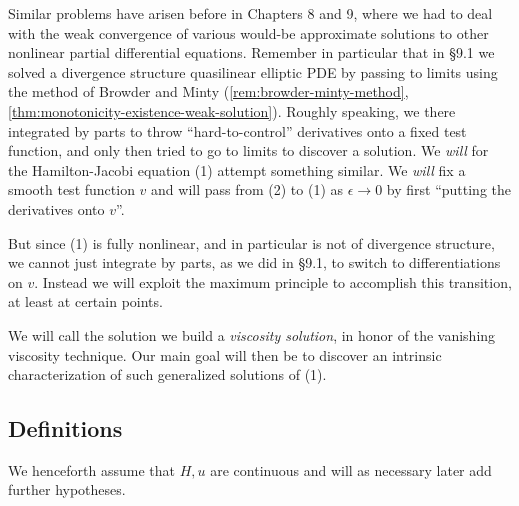 Similar problems have arisen before in Chapters 8 and 9, where we had to deal with the weak convergence of various would-be approximate solutions to other nonlinear partial differential equations. Remember in particular that in \S9.1 we solved a divergence structure quasilinear elliptic PDE by passing to limits using the method of Browder and Minty (\cref{rem:browder-minty-method}, \cref{thm:monotonicity-existence-weak-solution}). Roughly speaking, we there integrated by parts to throw ``hard-to-control'' derivatives onto a fixed test function, and only then tried to go to limits to discover a solution. We \textit{will} for the Hamilton-Jacobi equation (1) attempt something similar. We \textit{will} fix a smooth test function $v$ and will pass from (2) to (1) as $\epsilon \to 0$ by first ``putting the derivatives onto $v$''.

But since (1) is fully nonlinear, and in particular is not of divergence structure, we cannot just integrate by parts, as we did in \S9.1, to switch to differentiations on $v$. Instead we will exploit the maximum principle to accomplish this transition, at least at certain points.

We will call the solution we build a \textit{viscosity solution}, in honor of the vanishing viscosity technique. Our main goal will then be to discover an intrinsic characterization of such generalized solutions of (1).

\subsection{Definitions}

We henceforth assume that $H, u$ are continuous and will as necessary later add further hypotheses.


